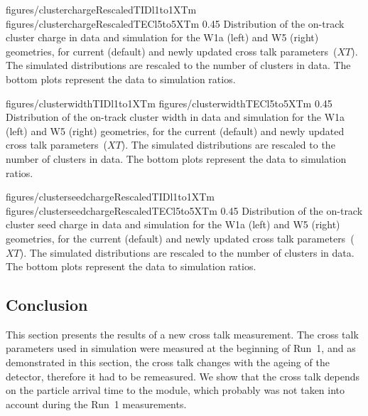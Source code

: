                 {figures/clusterchargeRescaledTIDl1to1XTm} %
                 {figures/clusterchargeRescaledTECl5to5XTm} %
                 {0.45}       %
                 { Distribution of the on-track cluster charge in data and simulation for the W1a (left) and W5 (right) geometries, for current (default) and newly updated cross talk parameters~($XT$).  The simulated distributions are rescaled to the number of clusters in data.  The bottom plots represent the data to simulation ratios. }

                 {figures/clusterwidthTIDl1to1XTm}
                 {figures/clusterwidthTECl5to5XTm}
                 {0.45}       %
                 { Distribution of the on-track cluster width in data and simulation for the W1a (left) and W5 (right) geometries, for the current (default) and newly updated cross talk parameters~($XT$).  The simulated distributions are rescaled to the number of clusters in data.  The bottom plots represent the data to simulation ratios. }

                 {figures/clusterseedchargeRescaledTIDl1to1XTm} %
                 {figures/clusterseedchargeRescaledTECl5to5XTm} %
                 {0.45}       %
                 { Distribution of the on-track cluster seed charge in data and simulation for the W1a (left) and W5 (right) geometries, for the current (default) and newly updated cross talk parameters~($XT$).  The simulated distributions are rescaled to the number of clusters in data.  The bottom plots represent the data to simulation ratios. }

\subsection{Conclusion}

This section presents the results of a new cross talk measurement. The cross talk parameters used in simulation were measured at the beginning of Run~1, and as demonstrated in this section, the cross talk changes with the ageing of the detector, therefore it had to be remeasured. We show that the cross talk depends on the particle arrival time to the module, which probably was not taken into account during the Run~1 measurements. 

